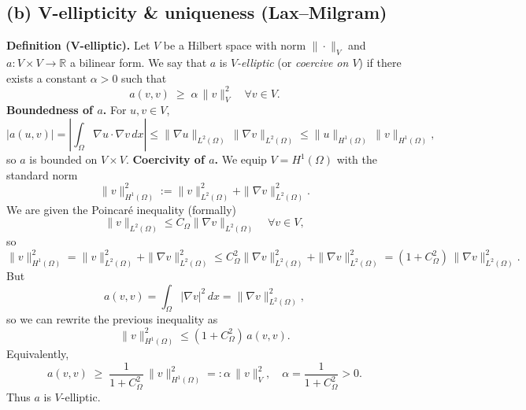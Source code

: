 \subsection*{(b) V-ellipticity \& uniqueness (Lax--Milgram)}

\textbf{Definition (V-elliptic).}
Let $V$ be a Hilbert space with norm $\|\cdot\|_V$ and $a : V\times V \to \mathbb{R}$ a bilinear form.
We say that $a$ is \emph{$V$-elliptic} (or \emph{coercive on $V$}) if there exists a constant $\alpha>0$ such that
\[
  a(v,v) \;\ge\; \alpha\,\|v\|_V^2 \quad \forall v \in V.
\]
\textbf{Boundedness of $a$.}
For $u,v \in V$,
\[
  |a(u,v)|
  = \left|\int_\Omega \nabla u \cdot \nabla v\,dx\right|
  \le \|\nabla u\|_{L^2(\Omega)}\,\|\nabla v\|_{L^2(\Omega)}
  \le \|u\|_{H^1(\Omega)}\,\|v\|_{H^1(\Omega)},
\]
so $a$ is bounded on $V\times V$.
\textbf{Coercivity of $a$.}
We equip $V = H^1(\Omega)$ with the standard norm
\[
  \|v\|_{H^1(\Omega)}^2 := \|v\|_{L^2(\Omega)}^2 + \|\nabla v\|_{L^2(\Omega)}^2.
\]
We are given the Poincaré inequality (formally)
\[
  \|v\|_{L^2(\Omega)} \le C_\Omega \|\nabla v\|_{L^2(\Omega)} \quad\forall v\in V,
\]
so
\[
  \|v\|_{H^1(\Omega)}^2
  = \|v\|_{L^2(\Omega)}^2 + \|\nabla v\|_{L^2(\Omega)}^2
  \le C_\Omega^2 \|\nabla v\|_{L^2(\Omega)}^2 + \|\nabla v\|_{L^2(\Omega)}^2
  = (1+C_\Omega^2)\,\|\nabla v\|_{L^2(\Omega)}^2.
\]
But
\[
  a(v,v) = \int_\Omega |\nabla v|^2 \,dx = \|\nabla v\|_{L^2(\Omega)}^2,
\]
so we can rewrite the previous inequality as
\[
  \|v\|_{H^1(\Omega)}^2 \le (1+C_\Omega^2)\,a(v,v).
\]
Equivalently,
\[
  a(v,v) \;\ge\; \frac{1}{1+C_\Omega^2}\,\|v\|_{H^1(\Omega)}^2
  =:\alpha\,\|v\|_V^2,\quad \alpha = \frac{1}{1+C_\Omega^2}>0.
\]
Thus $a$ is $V$-elliptic.

